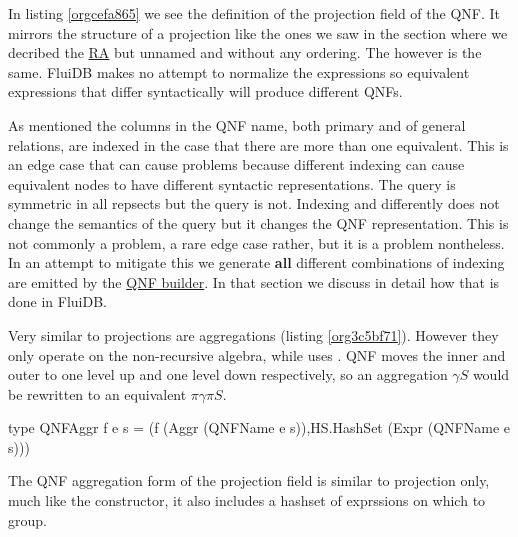 In listing \ref{orgcefa865} we see the definition of the projection field
of the QNF. It mirrors the structure of a projection like the ones we
saw in the section where we decribed the \hyperref[sec:relational_algebra_semantics]{RA} but unnamed and without
any ordering. The  however is the same. FluiDB makes no attempt
to normalize the expressions so equivalent expressions that differ
syntactically will produce different QNFs.

As mentioned the columns in the QNF name, both primary and of general
relations, are indexed in the case that there are more than one
equivalent. This is an edge case that can cause problems because
different indexing can cause equivalent nodes to have different
syntactic representations. The query  is symmetric in all repsects but the query
 is not. Indexing
 and  differently does not change the semantics of the query
but it changes the QNF representation. This is not commonly a problem,
a rare edge case rather, but it is a problem nontheless. In an attempt
to mitigate this we generate \textbf{all} different combinations of indexing
are emitted by the \hyperref[sec:org3f1036f]{QNF builder}. In that section we discuss in detail
how that is done in FluiDB.

Very similar to projections are aggregations (listing
\ref{org3c5bf71}). However they only operate on the non-recursive 
algebra, while  uses . QNF moves the
inner and outer  to one level up and one level down
respectively, so an aggregation \(\gamma S\) would be rewritten to an
equivalent \(\pi \gamma \pi S\).

\begin{code}
  \begin{haskellcode}
    type QNFAggr f e s =
    (f (Aggr (QNFName e s)),HS.HashSet (Expr (QNFName e s)))
  \end{haskellcode}
  \caption{\label{org3c5bf71}The QNF aggregation form of the projection field is similar to projection only, much like the  constructor, it also includes a hashset of exprssions on which to group.}
\end{code}

